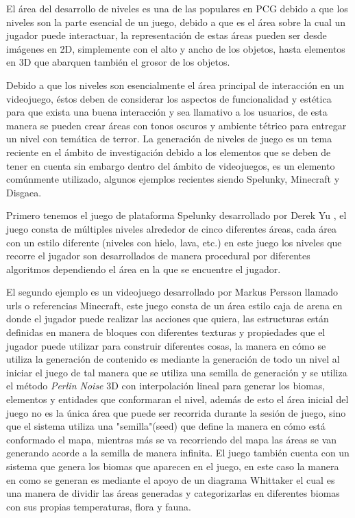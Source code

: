 El área del desarrollo de niveles es una de las populares en PCG debido a que
los niveles son la parte esencial de un juego, debido a que es el área sobre la
cual un jugador puede interactuar, la representación de estas áreas pueden ser 
desde imágenes en 2D, simplemente con el alto y ancho de los objetos, hasta
elementos en 3D que abarquen también el grosor de los objetos.

Debido a que los niveles son esencialmente el área principal de interacción en
un videojuego, éstos deben de considerar los aspectos de funcionalidad y estética
para que exista una buena interacción y sea llamativo a los usuarios, de esta
manera se pueden crear áreas con tonos oscuros y ambiente tétrico para entregar
un nivel con temática de terror. La generación de niveles de juego es un tema
reciente en el ámbito de investigación debido a los elementos que se deben de
tener en cuenta sin embargo dentro del ámbito de videojuegos, es un elemento
comúnmente utilizado, algunos ejemplos recientes siendo Spelunky, Minecraft y
Disgaea. %

Primero tenemos el juego de plataforma Spelunky desarrollado por Derek
Yu \cite{Mossmouth2013} \cite{SpelunkyAndrew2009}, el juego consta de múltiples niveles
alrededor de cinco diferentes áreas, cada área con un estilo diferente (niveles
con hielo, lava, etc.) en este juego los niveles que recorre el jugador son
desarrollados de manera procedural por diferentes algoritmos dependiendo el área
en la que se encuentre el jugador.\cite{BurchAnthony2009}%

El segundo ejemplo es un videojuego desarrollado por Markus Persson llamado %
urls o referencias Minecraft, \cite{PerssonK2011} \cite{DoulAndrew2008} este
juego consta de un área estilo caja de arena en donde el jugador puede realizar
las acciones que quiera, las estructuras están definidas en manera de bloques
con diferentes texturas y propiedades que el jugador puede utilizar para
construir diferentes cosas, la manera en cómo se utiliza la generación de
contenido es mediante la generación de todo un nivel al iniciar el juego de tal
manera que se utiliza una semilla de generación y se utiliza el método
\textit{Perlin Noise} \cite{perlin1988image} 3D con interpolación lineal para
generar los biomas, elementos y entidades que conformaran el nivel, además de
esto el área inicial del juego no es la única área que puede ser recorrida
durante la sesión de juego, sino que el sistema utiliza una "semilla"(seed) que
define la manera en cómo está conformado el mapa, mientras más se va recorriendo
del mapa las áreas se van generando acorde a la semilla de manera infinita. El
juego también cuenta con un sistema que genera los biomas que aparecen en el
juego, en este caso la manera en como se generan es mediante el apoyo de un
diagrama Whittaker \cite{WhittakerDiagramAndrew2008} el cual es una manera de
dividir las áreas generadas y categorizarlas en diferentes biomas con sus
propias temperaturas, flora y fauna. 

